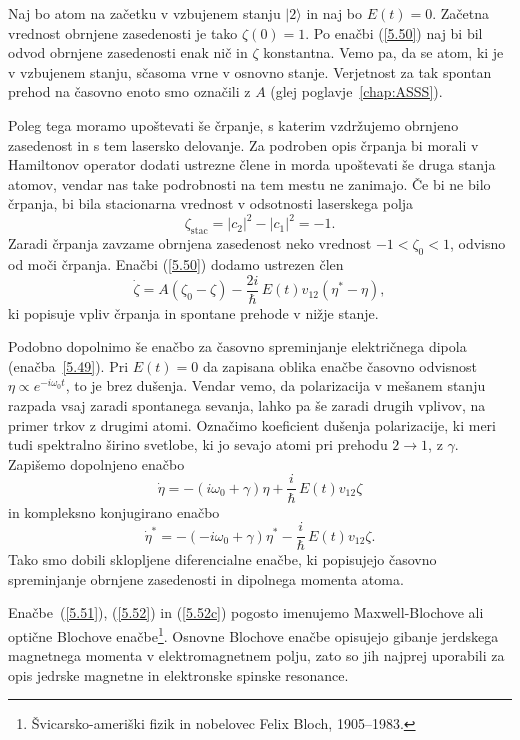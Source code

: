 Naj bo atom na začetku v vzbujenem stanju $|2\rangle$ in naj bo $E(t)=0$. Začetna
vrednost obrnjene zasedenosti je tako $\zeta(0)=1$. Po enačbi (\ref{5.50}) naj bi 
bil odvod obrnjene zasedenosti enak nič in $\zeta$ konstantna. 
Vemo pa, da se atom, ki je v vzbujenem stanju, sčasoma vrne v
osnovno stanje. Verjetnost za tak spontan prehod na časovno enoto smo označili z $A$ (glej 
poglavje~\ref{chap:ASSS}).

Poleg tega moramo upoštevati še črpanje, s katerim
vzdržujemo obrnjeno zasedenost in s tem lasersko delovanje. Za podroben
opis črpanja bi morali v Hamiltonov operator dodati ustrezne člene in
morda upoštevati še druga stanja atomov, vendar nas take podrobnosti na
tem mestu ne zanimajo. Če bi ne bilo črpanja, bi bila stacionarna vrednost
v odsotnosti laserskega polja
\begin{equation}
 \zeta_{\mathrm{stac}}= |c_2|^2-|c_1|^2 = -1.
\end{equation}
Zaradi črpanja zavzame obrnjena zasedenost neko vrednost $-1<\zeta_0<1$, 
odvisno od moči črpanja. Enačbi (\ref{5.50}) dodamo ustrezen člen
\begin{equation}  
\label{5.51}
\dot{\zeta}=A\left(\zeta_0-\zeta\right)- \frac{2i}{\hbar}\,E(t)v_{12}\left(\eta^{\ast}-\eta\right),
\end{equation}
ki popisuje vpliv črpanja in spontane prehode v nižje stanje. 

Podobno dopolnimo še enačbo za časovno spreminjanje električnega dipola 
(enačba~\ref{5.49}). Pri $E(t)=0$ da zapisana oblika enačbe časovno odvisnost 
$\eta \propto e^{-i \omega_0 t}$, to je brez dušenja. Vendar vemo, da
polarizacija v mešanem stanju razpada vsaj zaradi spontanega sevanja, lahko
pa še zaradi drugih vplivov, na primer trkov z drugimi atomi. Označimo
koeficient dušenja polarizacije, ki meri tudi spektralno širino svetlobe, 
ki jo sevajo atomi pri prehodu $2\rightarrow 1$, z $\gamma$. Zapišemo
dopolnjeno enačbo
\begin{equation}  
\label{5.52}
\dot{\eta}=- \left(i \omega_0+\gamma\right)\eta+\frac{i}{\hbar}\,E(t)v_{12} \zeta
\end{equation}
in kompleksno konjugirano enačbo
\begin{equation}  
\label{5.52c}
\dot{\eta}^*=-\left(-i \omega_0+\gamma\right)\eta^*-\frac{i}{\hbar}\,E(t)v_{12} \zeta.
\end{equation}
Tako smo dobili sklopljene diferencialne enačbe, ki popisujejo časovno
spreminjanje obrnjene zasedenosti in dipolnega momenta atoma. 
\begin{remark}
 Enačbe~(\ref{5.51}), (\ref{5.52}) in (\ref{5.52c}) pogosto imenujemo 
 Maxwell-Blochove ali optične Blochove enačbe\footnote{Švicarsko-ameriški fizik in nobelovec Felix Bloch, 1905--1983.}. Osnovne Blochove enačbe opisujejo gibanje jerdskega magnetnega
 momenta v elektromagnetnem polju, zato so jih najprej uporabili za opis 
 jedrske magnetne in elektronske spinske resonance. 
\end{remark}

